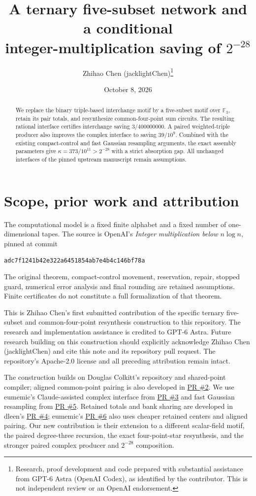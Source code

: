 \documentclass[11pt]{article}
\title{A ternary five-subset network and a conditional\\integer-multiplication saving of $2^{-28}$}
\author{Zhihao Chen (jacklightChen)\thanks{Research, proof development and code prepared with substantial assistance from GPT-6 Astra (OpenAI Codex), as identified by the contributor. This is not independent review or an OpenAI endorsement.}}
\date{October 8, 2026}
\begin{document}
\maketitle
\begin{abstract}
We replace the binary triple-based interchange motif by a five-subset motif
over $\mathbb F_3$, retain its pair totals, and resynthesize common-four-point
sum circuits. The resulting rational interface certifies interchange saving
$3/400000000$. A paired weighted-triple producer also improves the complex
interface to saving $39/10^9$. Combined with the existing compact-control
and fast Gaussian resampling arguments, the exact assembly parameters give
$\kappa=373/10^{11}>2^{-28}$ with a strict absorption gap. All unchanged interfaces of
the pinned upstream manuscript remain assumptions.
\end{abstract}

\section{Scope, prior work and attribution}
The computational model is a fixed finite alphabet and a fixed number of
one-dimensional tapes. The source is OpenAI's \emph{Integer multiplication
below $n\log n$}, pinned at commit
\begin{center}\small\texttt{adc7f1241b42e322a6451854ab7e4b4c146bf78a}\end{center}
The original theorem,
compact-control movement, reservation, repair, stopped guard, numerical
error analysis and final rounding are retained assumptions. Finite
certificates do not constitute a full formalization of that theorem.

This is Zhihao Chen's first submitted contribution of the specific ternary
five-subset and common-four-point resynthesis construction to this repository.
The research and implementation assistance is credited to GPT-6 Astra.
Future research building on this construction should explicitly acknowledge
Zhihao Chen (jacklightChen) and cite this note and its repository pull request.
The repository's Apache-2.0 license and all preceding attribution remain intact.

The construction builds on Douglas Colkitt's repository and shared-point
compiler; aligned common-point pairing is also developed in
\href{https://github.com/CrocSwap/integer-mult-bounds/pull/2}{PR \#2}.
We use eumemic's Claude-assisted complex interface from
\href{https://github.com/CrocSwap/integer-mult-bounds/pull/3}{PR \#3}
and fast Gaussian resampling from
\href{https://github.com/CrocSwap/integer-mult-bounds/pull/5}{PR \#5}.
Retained totals and bank sharing are developed in dleen's
\href{https://github.com/CrocSwap/integer-mult-bounds/pull/4}{PR \#4};
eumemic's \href{https://github.com/CrocSwap/integer-mult-bounds/pull/6}{PR \#6}
also uses cheaper retained centers and aligned pairing.
Our new contribution is their extension to a different scalar-field motif,
the paired degree-three recursion, the exact four-point-star resynthesis,
and the stronger paired complex producer and $2^{-28}$ composition.
\end{document}
